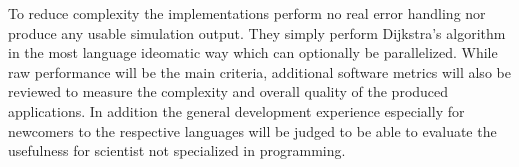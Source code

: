 To reduce complexity the implementations perform no real error handling nor produce any usable simulation output. They simply perform Dijkstra's algorithm in the most language ideomatic way which can optionally be parallelized. While raw performance will be the main criteria, additional software metrics will also be reviewed to measure the complexity and overall quality of the produced applications. In addition the general development experience especially for newcomers to the respective languages will be judged to be able to evaluate the usefulness for scientist not specialized in programming.

